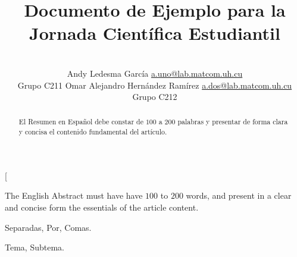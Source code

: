 \documentclass[a4paper,10pt,twocolumn]{article}
\title{Documento de Ejemplo para la Jornada Científica Estudiantil}
\author{\\
\name Andy Ledesma García \email \href{mailto:a.uno@lab.matcom.uh.cu}{a.uno@lab.matcom.uh.cu}
	\\ \addr Grupo C211 \AND
\name Omar Alejandro Hernández Ramírez \email \href{mailto:a.dos@lab.matcom.uh.cu}{a.dos@lab.matcom.uh.cu}
  \\ \addr Grupo C212}
\begin{document}
\twocolumn[

\maketitle


\begin{abstract}

	El Resumen en Español debe constar de $100$ a $200$ palabras y presentar de forma
	clara y concisa el contenido fundamental del artículo.

\end{abstract}

\vspace{0.5cm}

\begin{enabstract}

  The English Abstract must have have $100$ to $200$ words, and present in a clear
  and concise form the essentials of the article content.

\end{enabstract}

\begin{keywords}
	Separadas,
	Por,
	Comas.
\end{keywords}

\begin{topics}
	Tema, Subtema.
\end{topics}
\end{document}
